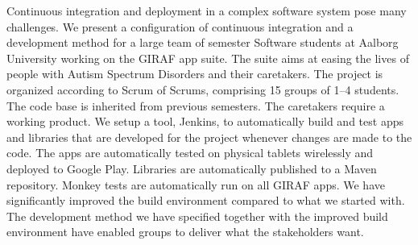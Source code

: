 Continuous integration and deployment in a complex software system pose many challenges. We present a configuration of continuous integration and a development method for a large team of  semester Software students at Aalborg University working on the GIRAF app suite. The suite aims at easing the lives of people with Autism Spectrum Disorders and their caretakers. The project is organized according to Scrum of Scrums, comprising 15 groups of 1--4 students. The code base is inherited from previous semesters. The caretakers require a working product. We setup a tool, Jenkins, to automatically build and test apps and libraries that are developed for the project whenever changes are made to the code. The apps are automatically tested on physical tablets wirelessly and deployed to Google Play. Libraries are automatically published to a Maven repository. Monkey tests are automatically run on all GIRAF apps. We have significantly improved the build environment compared to what we started with. The development method we have specified together with the improved build environment have enabled groups to deliver what the stakeholders want.